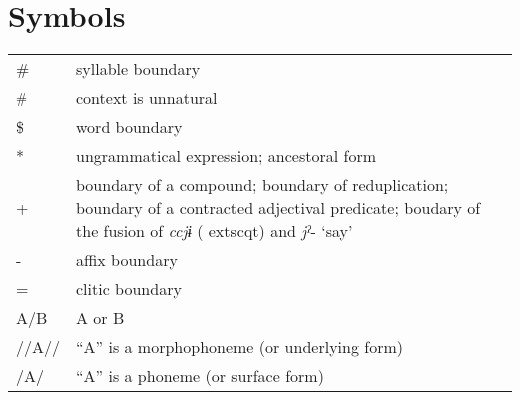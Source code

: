 \section*{Symbols}\enlargethispage{\baselineskip}
\begin{tabularx}{\textwidth}{@{}lQ@{}}
\#    & syllable boundary\\
\textsuperscript{\#}    & context is unnatural\\
\$    & word boundary\\
*    & ungrammatical expression; ancestoral form\\
+    & boundary of a compound; boundary of reduplication; boundary of a contracted adjectival predicate; boudary of the fusion of \textit{ccjɨ} (	extsc{qt}) and \textit{jˀ}{}- ‘say’\\
{}-    & affix boundary\\
=    & clitic boundary\\
A/B    & A or B\\
//A//    & “A” is a morphophoneme (or underlying form)\\
/A/    & “A” is a phoneme (or surface form)
\end{tabularx}
